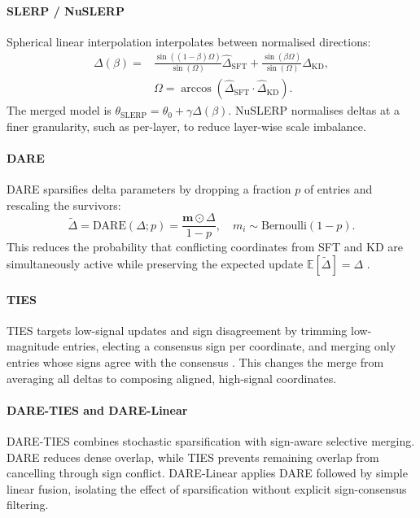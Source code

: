 \documentclass[conference]{IEEEtran}
\begin{document}
\paragraph{SLERP / NuSLERP}
Spherical linear interpolation interpolates between normalised directions:
\begin{equation}
\begin{split}
\Delta(\beta) = & \frac{\sin((1-\beta)\Omega)}{\sin(\Omega)}\widehat{\Delta}_{\text{SFT}}+\frac{\sin(\beta\Omega)} {\sin(\Omega)}\widehat{\Delta}_{\text{KD}}, \\
& \Omega=\arccos(\widehat{\Delta}_{\text{SFT}}\cdot\widehat{\Delta}_{\text{KD}}).
\end{split}
\end{equation}
The merged model is $\theta_{\text{SLERP}}=\theta_0+\gamma\Delta(\beta)$. NuSLERP normalises deltas at a finer granularity, such as per-layer, to reduce layer-wise scale imbalance.

\paragraph{DARE}
DARE sparsifies delta parameters by dropping a fraction $p$ of entries and rescaling the survivors:
\begin{equation}
\widetilde{\Delta}=\mathrm{DARE}(\Delta;p)=\frac{\mathbf{m}\odot \Delta}{1-p}, \quad m_i\sim\mathrm{Bernoulli}(1-p).
\end{equation}
This reduces the probability that conflicting coordinates from SFT and KD are simultaneously active while preserving the expected update $\mathbb{E}[\widetilde{\Delta}]=\Delta$ \cite{yu2023supermario}.

\paragraph{TIES}
TIES targets low-signal updates and sign disagreement by trimming low-magnitude entries, electing a consensus sign per coordinate, and merging only entries whose signs agree with the consensus \cite{yadav2023ties}. This changes the merge from averaging all deltas to composing aligned, high-signal coordinates.

\paragraph{DARE-TIES and DARE-Linear}
DARE-TIES combines stochastic sparsification with sign-aware selective merging. DARE reduces dense overlap, while TIES prevents remaining overlap from cancelling through sign conflict. DARE-Linear applies DARE followed by simple linear fusion, isolating the effect of sparsification without explicit sign-consensus filtering.
\end{document}
